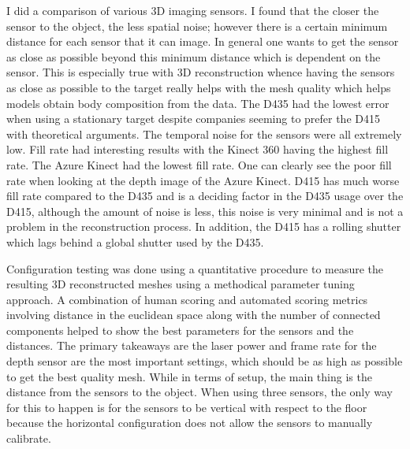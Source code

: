 I did a comparison of various 3D imaging sensors. I found that the closer the sensor to the object, the less spatial noise; however there is a certain minimum distance for each sensor that it can image. In general one wants to get the sensor as close as possible beyond this minimum distance which is dependent on the sensor. This is especially true with 3D reconstruction whence having the sensors as close as possible to the target really helps with the mesh quality which helps models obtain body composition from the data. The D435 had the lowest error when using a stationary target despite companies seeming to prefer the D415 with theoretical arguments. The temporal noise for the sensors were all extremely low. Fill rate had interesting results with the Kinect 360 having the highest fill rate. The Azure Kinect had the lowest fill rate. One can clearly see the poor fill rate when looking at the depth image of the Azure Kinect. D415 has much worse fill rate compared to the D435 and is a deciding factor in the D435 usage over the D415, although the amount of noise is less, this noise is very minimal and is not a problem in the reconstruction process. In addition, the D415 has a rolling shutter which lags behind a global shutter used by the D435.

Configuration testing was done using a quantitative procedure to measure the resulting 3D reconstructed meshes using a methodical parameter tuning approach. A combination of human scoring and automated scoring metrics involving distance in the euclidean space along with the number of connected components helped to show the best parameters for the sensors and the distances. The primary takeaways are the laser power and frame rate for the depth sensor are the most important settings, which should be as high as possible to get the best quality mesh. While in terms of setup, the main thing is the distance from the sensors to the object. When using three sensors, the only way for this to happen is for the sensors to be vertical with respect to the floor because the horizontal configuration does not allow the sensors to manually calibrate. 

